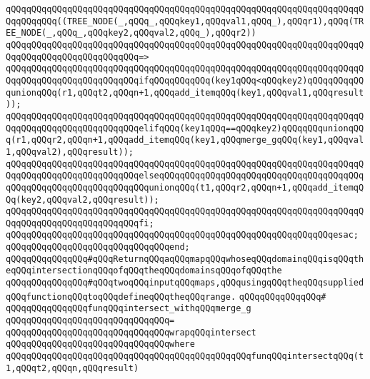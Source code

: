 \newline
\verb|qQQqqQQqqQQqqQQqqQQqqQQqqQQqqQQqqQQqqQQqqQQqqQQqqQQqqQQqqQQqqQQqqQQqqQQqqQQqqQQq((TREE_NODE(_,qQQq_,qQQqkey1,qQQqval1,qQQq_),qQQqr1),qQQq(TREE_NODE(_,qQQq_,qQQqkey2,qQQqval2,qQQq_),qQQqr2))|\newline
\verb|qQQqqQQqqQQqqQQqqQQqqQQqqQQqqQQqqQQqqQQqqQQqqQQqqQQqqQQqqQQqqQQqqQQqqQQqqQQqqQQqqQQqqQQqqQQqqQQq=>|\newline
\verb|qQQqqQQqqQQqqQQqqQQqqQQqqQQqqQQqqQQqqQQqqQQqqQQqqQQqqQQqqQQqqQQqqQQqqQQqqQQqqQQqqQQqqQQqqQQqqQQqifqQQqqQQqqQQq(key1qQQq<qQQqkey2)qQQqqQQqqQQqunionqQQq(r1,qQQqt2,qQQqn+1,qQQqadd_itemqQQq(key1,qQQqval1,qQQqresult));|\newline
\verb|qQQqqQQqqQQqqQQqqQQqqQQqqQQqqQQqqQQqqQQqqQQqqQQqqQQqqQQqqQQqqQQqqQQqqQQqqQQqqQQqqQQqqQQqqQQqqQQqelifqQQq(key1qQQq==qQQqkey2)qQQqqQQqunionqQQq(r1,qQQqr2,qQQqn+1,qQQqadd_itemqQQq(key1,qQQqmerge_gqQQq(key1,qQQqval1,qQQqval2),qQQqresult));|\newline
\verb|qQQqqQQqqQQqqQQqqQQqqQQqqQQqqQQqqQQqqQQqqQQqqQQqqQQqqQQqqQQqqQQqqQQqqQQqqQQqqQQqqQQqqQQqqQQqqQQqelseqQQqqQQqqQQqqQQqqQQqqQQqqQQqqQQqqQQqqQQqqQQqqQQqqQQqqQQqqQQqqQQqqQQqunionqQQq(t1,qQQqr2,qQQqn+1,qQQqadd_itemqQQq(key2,qQQqval2,qQQqresult));|\newline
\verb|qQQqqQQqqQQqqQQqqQQqqQQqqQQqqQQqqQQqqQQqqQQqqQQqqQQqqQQqqQQqqQQqqQQqqQQqqQQqqQQqqQQqqQQqqQQqqQQqfi;|\newline
\verb|qQQqqQQqqQQqqQQqqQQqqQQqqQQqqQQqqQQqqQQqqQQqqQQqqQQqqQQqqQQqqQQqesac;|\newline
\verb|qQQqqQQqqQQqqQQqqQQqqQQqqQQqqQQqend;|\newline
\newline
\verb|qQQqqQQqqQQqqQQq#qQQqReturnqQQqaqQQqmapqQQqwhoseqQQqdomainqQQqisqQQqtheqQQqintersectionqQQqofqQQqtheqQQqdomainsqQQqofqQQqthe|\newline
\verb|qQQqqQQqqQQqqQQq#qQQqtwoqQQqinputqQQqmaps,qQQqusingqQQqtheqQQqsuppliedqQQqfunctionqQQqtoqQQqdefineqQQqtheqQQqrange.|\newline
\verb|qQQqqQQqqQQqqQQq#|\newline
\verb|qQQqqQQqqQQqqQQqfunqQQqintersect_withqQQqmerge_g|\newline
\verb|qQQqqQQqqQQqqQQqqQQqqQQqqQQqqQQq=|\newline
\verb|qQQqqQQqqQQqqQQqqQQqqQQqqQQqqQQqwrapqQQqintersect|\newline
\verb|qQQqqQQqqQQqqQQqqQQqqQQqqQQqqQQqwhere|\newline
\verb|qQQqqQQqqQQqqQQqqQQqqQQqqQQqqQQqqQQqqQQqqQQqqQQqfunqQQqintersectqQQq(t1,qQQqt2,qQQqn,qQQqresult)|\newline
